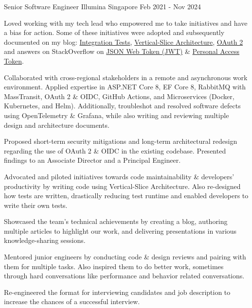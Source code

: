 \begin{cventries}
\cventry
{Senior Software Engineer} %
{Illumina} %
{Singapore} %
{Feb 2021 - Nov 2024} %
{
  \begin{cvitems} %
    \item {Loved working with my tech lead who empowered me to take initiatives and have a bias for action. Some of these initiatives were adopted and subsequently documented on my blog: \href{https://bit.ly/zy-tests}{Integration Tests}, \href{https://bit.ly/zy-vsa}{Vertical-Slice Architecture}, \href{https://bit.ly/zy-oauth2}{OAuth 2} and answers on StackOverflow on \href{https://bit.ly/zy-jwt}{JSON Web Token (JWT)} \& \href{https://bit.ly/zy-pat}{Personal Access Token}.}
    \item {Collaborated with cross-regional stakeholders in a remote and asynchronous work environment. Applied expertise in ASP.NET Core 8, EF Core 8, RabbitMQ with MassTransit, OAuth 2 \& OIDC, GitHub Actions, and Microservices (Docker, Kubernetes, and Helm). Additionally, troubleshot and resolved software defects using OpenTelemetry \& Grafana, while also writing and reviewing multiple design and architecture documents.}
    \item {Proposed short-term security mitigations and long-term architectural redesign regarding the use of OAuth 2 \& OIDC in the existing codebase. Presented findings to an Associate Director and a Principal Engineer.}
    \item {Advocated and piloted initiatives towards code maintainability \& developers' productivity by writing code using Vertical-Slice Architecture. Also re-designed how tests are written, drastically reducing test runtime and enabled developers to write their own tests.}
    \item {Showcased the team's technical achievements by creating a blog, authoring multiple articles to highlight our work, and delivering presentations in various knowledge-sharing sessions.}
    \item {Mentored junior engineers by conducting code \& design reviews and pairing with them for multiple tasks. Also inspired them to do better work, sometimes through hard conversations like performance and behavior related conversations.}
    \item {Re-engineered the format for interviewing candidates and job description to increase the chances of a successful interview.}
  \end{cvitems}
}


\end{cventries}
